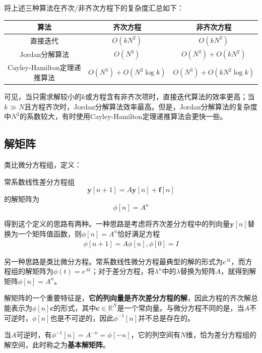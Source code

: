 将上述三种算法在齐次/非齐次方程下的复杂度汇总如下：
\begin{table}[h]
    \centering
    \begin{tabular}{|c|c|c|}
        \hline
        算法 & 齐次方程 & 非齐次方程 \\
        \hline
        直接迭代 & $O(k N^2)$ & $O(k N^2)$ \\
        \hline
        Jordan分解算法 & $O(N^3)$ & $O(N^3)+O(k N^2)$ \\
        \hline
        Cayley-Hamilton定理递推算法 & $O(N^3)+O(N^2 \log k)$ & $O(N^3)+O(k N^2 \log k)$ \\
        \hline
    \end{tabular}
\end{table}

可见，当只需求解较小的$k$或方程含有非齐次项时，直接迭代算法的效率更高；当$k\gg N$且方程齐次时，Jordan分解算法效率最高。但是，Jordan分解算法的复杂度中$N^3$的系数较大，有时使用Cayley-Hamilton定理递推算法会更快一些。

\subsection{解矩阵}\label{sub:fundamental_solution_matrix}

类比微分方程组，定义：
\begin{definition}[解矩阵]
    常系数线性差分方程组
    $$\mathbf{y}[n+1] = A \mathbf{y}[n] + \mathbf{f}[n]$$
    的解矩阵为
    $$\phi[n]=A^n$$
\end{definition}

得到这个定义的思路有两种。一种思路是考虑将齐次差分方程中的列向量$\mathbf{y}[n]$替换为一个矩阵值函数，则$\phi[n]=A^n$恰好满足方程\begin{align*}
    \phi[n+1] = A \phi[n],\phi[0] = I
\end{align*}

另一种思路是类比微分方程。常系数线性微分方程最典型的解的形式为$e^{\lambda t}$，而方程组的解矩阵为$\phi(t)=e^{At}$；对于差分方程，将$\lambda^n$中的$\lambda$替换为矩阵$A$，就得到解矩阵$\phi[n]=A^n$。

解矩阵的一个重要特征是，\textbf{它的列向量是齐次差分方程的解}，因此方程的齐次解总能表示为$\phi[n]\mathbf{c}$的形式，其中$\mathbf{c}\in\mathbb{R}^N$是一个常向量。与微分方程不同的是，当$A$不可逆时，$\phi[n]$也是不可逆的，因此$\phi^{-1}[n]$并不总是存在的。

当$A$可逆时，有$\phi^{-1}[n] = A^{-n}=\phi[-n]$，它的列空间有$N$维，恰为差分方程组的解空间，此时称之为\textbf{基本解矩阵}。

